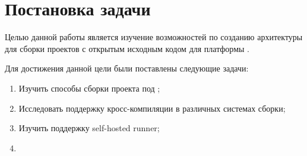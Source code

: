 
\section{Постановка задачи}
\label{sec:task}

Целью данной работы является изучение возможностей по созданию архитектуры для сборки проектов с открытым исходным кодом для платформы \riscv{}.

Для достижения данной цели были поставлены следующие задачи:
\begin{enumerate}
	\item Изучить способы сборки проекта под \riscv{};
	\item Исследовать поддержку кросс-компиляции в различных системах сборки;
	\item Изучить поддержку self-hosted \ci{} runner;
	\item {}
\end{enumerate}
